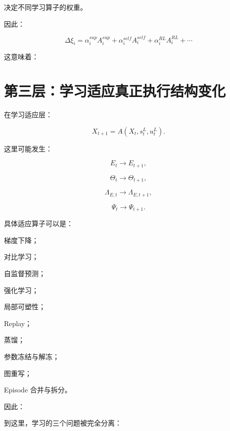 决定不同学习算子的权重。

因此：

\[
\boxed{
\Delta\xi_i
=
\alpha_i^{sup}
A_i^{sup}
+
\alpha_i^{self}
A_i^{self}
+
\alpha_i^{RL}
A_i^{RL}
+\cdots
}
\]

这意味着：

\begin{statementbox}
\centering
{}
\end{statementbox}


\section{第三层：学习适应真正执行结构变化}

在学习适应层：

\[
\boxed{
X_{t+1}
=
A
(
X_t,
s_t^L,
u_t^L
).
}
\]

这里可能发生：

\[
E_t\rightarrow E_{t+1},
\]

\[
\Theta_t\rightarrow\Theta_{t+1},
\]

\[
\Lambda_{E,t}
\rightarrow
\Lambda_{E,t+1},
\]

\[
\Psi_t
\rightarrow
\Psi_{t+1}.
\]

具体适应算子可以是：

梯度下降；

对比学习；

自监督预测；

强化学习；

局部可塑性；

Replay；

蒸馏；

参数冻结与解冻；

图重写；

Episode 合并与拆分。

因此：

\begin{statementbox}
\centering
{}
\end{statementbox}

到这里，学习的三个问题被完全分离：

\begin{statementbox}
\centering
{}
\end{statementbox}

